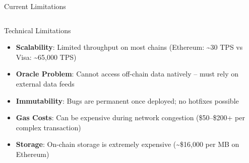 \documentclass[8pt,aspectratio=169]{beamer}
\begin{document}
\begin{frame}{Current Limitations}
\begin{columns}[T]
\begin{block}{Technical Limitations}
\footnotesize
\begin{itemize}
  \item \textbf{Scalability}: Limited throughput on most chains (Ethereum: \textasciitilde30 TPS vs Visa: \textasciitilde65,000 TPS)
  \item \textbf{Oracle Problem}: Cannot access off-chain data natively -- must rely on external data feeds
  \item \textbf{Immutability}: Bugs are permanent once deployed; no hotfixes possible
  \item \textbf{Gas Costs}: Can be expensive during network congestion (\$50--\$200+ per complex transaction)
  \item \textbf{Storage}: On-chain storage is extremely expensive (\textasciitilde\$16,000 per MB on Ethereum)
\end{itemize}
\end{block}


\end{columns}
\end{frame}
\end{document}
